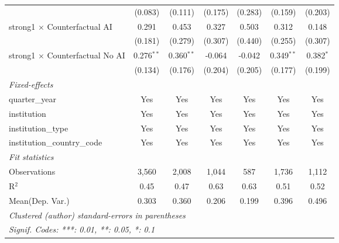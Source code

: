 \begin{tabular}{lcccccc}
                                          & (0.083)       & (0.111)       & (0.175) & (0.283) & (0.159)      & (0.203)\\   
   strong1 $\times$ Counterfactual AI     & 0.291         & 0.453         & 0.327   & 0.503   & 0.312        & 0.148\\   
                                          & (0.181)       & (0.279)       & (0.307) & (0.440) & (0.255)      & (0.307)\\   
   strong1 $\times$ Counterfactual No AI  & 0.276$^{**}$  & 0.360$^{**}$  & -0.064  & -0.042  & 0.349$^{**}$ & 0.382$^{*}$\\   
                                          & (0.134)       & (0.176)       & (0.204) & (0.205) & (0.177)      & (0.199)\\   
   \midrule
   \emph{Fixed-effects}\\
   quarter\_year                          & Yes           & Yes           & Yes     & Yes     & Yes          & Yes\\  
   institution                            & Yes           & Yes           & Yes     & Yes     & Yes          & Yes\\  
   institution\_type                      & Yes           & Yes           & Yes     & Yes     & Yes          & Yes\\  
   institution\_country\_code             & Yes           & Yes           & Yes     & Yes     & Yes          & Yes\\  
   \midrule
   \emph{Fit statistics}\\
   Observations                           & 3,560         & 2,008         & 1,044   & 587     & 1,736        & 1,112\\  
   R$^2$                                  & 0.45          & 0.47          & 0.63    & 0.63    & 0.51         & 0.52\\  
Mean(Dep. Var.) & 0.303 & 0.360 & 0.206 & 0.199 & 0.396 & 0.496 \\
   \midrule \midrule
   \multicolumn{7}{l}{\emph{Clustered (author) standard-errors in parentheses}}\\
   \multicolumn{7}{l}{\emph{Signif. Codes: ***: 0.01, **: 0.05, *: 0.1}}\\
\end{tabular}
\par\endgroup
